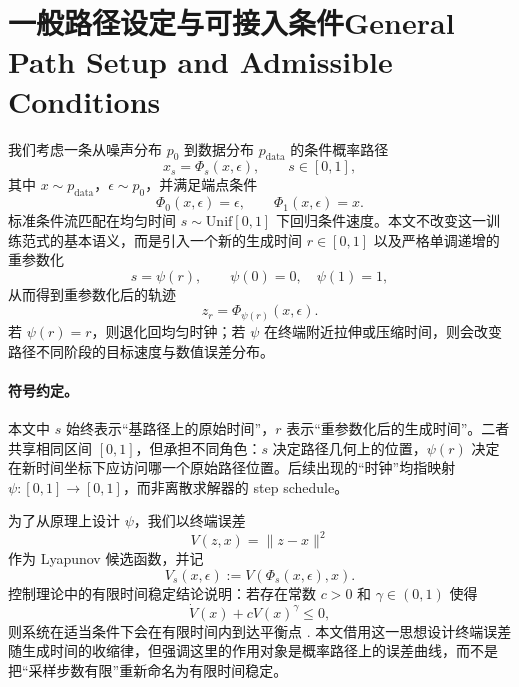 \section{\ifinternalcn 一般路径设定与可接入条件\else General Path Setup and Admissible Conditions\fi}

\ifinternalcn
我们考虑一条从噪声分布 $p_0$ 到数据分布 $p_{\mathrm{data}}$ 的条件概率路径
\begin{equation}
  x_s = \Phi_s(x,\epsilon), \qquad s \in [0,1],
\end{equation}
其中 $x \sim p_{\mathrm{data}}$，$\epsilon \sim p_0$，并满足端点条件
\begin{equation}
  \Phi_0(x,\epsilon)=\epsilon, \qquad \Phi_1(x,\epsilon)=x.
\end{equation}
标准条件流匹配在均匀时间 $s \sim \mathrm{Unif}[0,1]$ 下回归条件速度。本文不改变这一训练范式的基本语义，而是引入一个新的生成时间 $r \in [0,1]$ 以及严格单调递增的重参数化
\begin{equation}
  s = \psi(r), \qquad \psi(0)=0,\quad \psi(1)=1,
\end{equation}
从而得到重参数化后的轨迹
\begin{equation}
  z_r = \Phi_{\psi(r)}(x,\epsilon).
\end{equation}
若 $\psi(r)=r$，则退化回均匀时钟；若 $\psi$ 在终端附近拉伸或压缩时间，则会改变路径不同阶段的目标速度与数值误差分布。

\paragraph{符号约定。}
本文中 $s$ 始终表示“基路径上的原始时间”，$r$ 表示“重参数化后的生成时间”。二者共享相同区间 $[0,1]$，但承担不同角色：$s$ 决定路径几何上的位置，$\psi(r)$ 决定在新时间坐标下应访问哪一个原始路径位置。后续出现的“时钟”均指映射 $\psi:[0,1]\to[0,1]$，而非离散求解器的 step schedule。

为了从原理上设计 $\psi$，我们以终端误差
\begin{equation}
  V(z,x)=\|z-x\|^2
\end{equation}
作为 Lyapunov 候选函数，并记
\begin{equation}
  V_s(x,\epsilon) := V(\Phi_s(x,\epsilon),x).
\end{equation}
控制理论中的有限时间稳定结论说明：若存在常数 $c>0$ 和 $\gamma \in (0,1)$ 使得
\begin{equation}
  \dot{V}(x) + c V(x)^\gamma \le 0,
\end{equation}
则系统在适当条件下会在有限时间内到达平衡点 \citep{bhat2000finite}. 本文借用这一思想设计终端误差随生成时间的收缩律，但强调这里的作用对象是概率路径上的误差曲线，而不是把“采样步数有限”重新命名为有限时间稳定。

